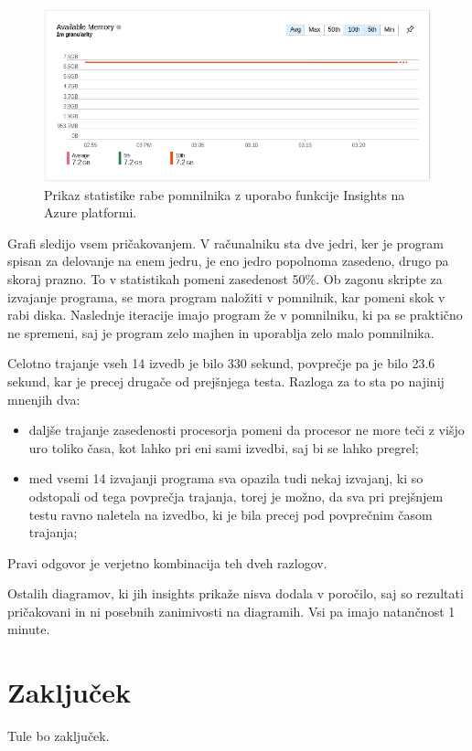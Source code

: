 \begin{figure}[H]
	\centering
	\includegraphics[scale=0.46]{Img/insights_mem.png}
	\caption{Prikaz statistike rabe pomnilnika z uporabo funkcije Insights na Azure platformi.}
	\label{fig:7_breme2}
\end{figure}

Grafi sledijo vsem pričakovanjem. V računalniku sta dve jedri, ker je program spisan za delovanje na enem jedru, je eno jedro popolnoma zasedeno, drugo pa skoraj prazno. To v statistikah pomeni zasedenost 50\%. Ob zagonu skripte za izvajanje programa, se mora program naložiti v pomnilnik, kar pomeni skok v rabi diska. Naslednje iteracije imajo program že v pomnilniku, ki pa se praktično ne spremeni, saj je program zelo majhen in uporablja zelo malo pomnilnika.

Celotno trajanje vseh 14 izvedb je bilo 330 sekund, povprečje pa je bilo 23.6 sekund, kar je precej drugače od prejšnjega testa. Razloga za to sta po najinij mnenjih dva:
\begin{itemize}
	\item daljše trajanje zasedenosti procesorja pomeni da procesor ne more teči z višjo uro toliko časa, kot lahko pri eni sami izvedbi, saj bi se lahko pregrel;
	\item med vsemi 14 izvajanji programa sva opazila tudi nekaj izvajanj, ki so odstopali od tega povprečja trajanja, torej je možno, da sva pri prejšnjem testu ravno naletela na izvedbo, ki je bila precej pod povprečnim časom trajanja;
\end{itemize}
Pravi odgovor je verjetno kombinacija teh dveh razlogov.

Ostalih diagramov, ki jih insights prikaže nisva dodala v poročilo, saj so rezultati pričakovani in ni posebnih zanimivosti na diagramih. Vsi pa imajo natančnost 1 minute.


\section{Zaključek}
Tule bo zaključek.

